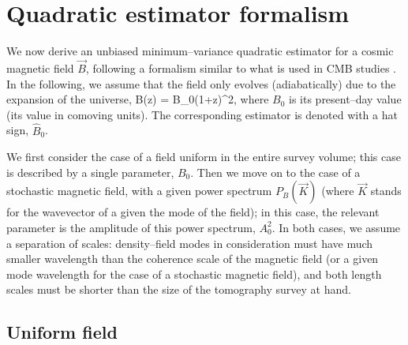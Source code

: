 \section{Quadratic estimator formalism}
\label{sec:estimators}

We now derive an unbiased minimum--variance quadratic estimator for a cosmic magnetic field $\vec B$, following a formalism similar to what is used in CMB studies \cite{2003PhRvD..67h3002O}. In the following, we assume that the field only evolves (adiabatically) due to the expansion of the universe, 
\beq
B(z) = B_0(1+z)^2,
\label{eq:B0}
\eeq
where $B_0$ is its present--day value (its value in comoving units). The corresponding estimator is denoted with a hat sign, $\widehat B_0$. 



We first consider the case of a field uniform in the entire survey volume; this case is described by a single parameter, $B_0$. Then we move on to the case of a stochastic magnetic field, with a given power spectrum $P_B(\vec K)$ (where $\vec K$ stands for the wavevector of a given the mode of the field); in this case, the relevant parameter is the amplitude of this power spectrum, $ A_0^2$. In both cases, we assume a separation of scales: density--field modes in consideration must have much smaller wavelength than the coherence scale of the magnetic field (or a given mode wavelength for the case of a stochastic magnetic field), and both length scales must be shorter than the size of the tomography survey at hand.

\subsection{Uniform field}
\label{subsec:uniform}

